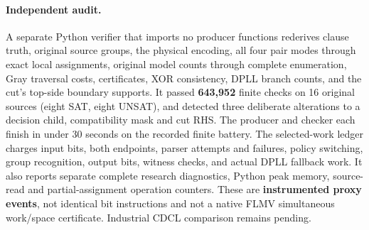 \documentclass[11pt]{article}
\begin{document}
\paragraph{Independent audit.}
A separate Python verifier that imports no producer functions rederives clause truth, original source groups, the physical encoding, all four pair modes through exact local assignments, original model counts through complete enumeration, Gray traversal costs, certificates, XOR consistency, DPLL branch counts, and the cut's top-side boundary supports. It passed \textbf{643,952} finite checks on 16 original sources (eight SAT, eight UNSAT), and detected three deliberate alterations to a decision child, compatibility mask and cut RHS. The producer and checker each finish in under 30 seconds on the recorded finite battery. The selected-work ledger charges input bits, both endpoints, parser attempts and failures, policy switching, group recognition, output bits, witness checks, and actual DPLL fallback work. It also reports separate complete research diagnostics, Python peak memory, source-read and partial-assignment operation counters. These are \textbf{instrumented proxy events}, not identical bit instructions and not a native FLMV simultaneous work/space certificate. Industrial CDCL comparison remains pending.
\end{document}
